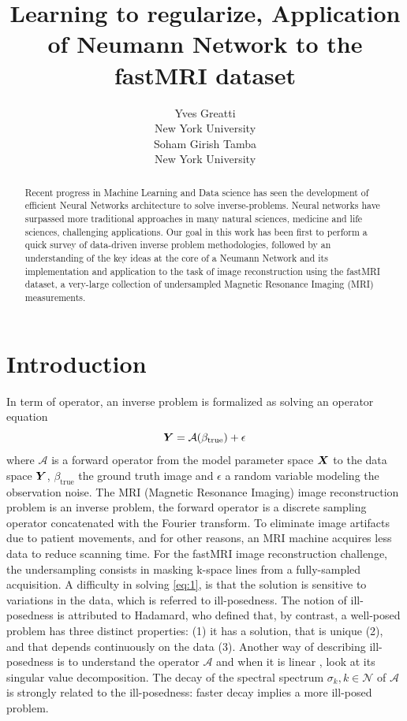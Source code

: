 \documentclass{article}
\title{Learning to regularize, Application of Neumann Network to the fastMRI dataset}
\author{%
  Yves Greatti \\
  New York University\\
   \And
    Soham Girish Tamba \\
    New York University\\
}
\begin{document}
\maketitle

\begin{abstract}
 Recent progress in Machine Learning and Data science has seen the development of efficient Neural Networks architecture to solve inverse-problems. Neural networks have surpassed more traditional approaches in 
  many natural sciences, medicine and life sciences, challenging applications.
 Our goal in this work has been first to perform a quick survey of data-driven inverse problem methodologies, followed by an understanding of the key ideas at the core of a Neumann Network and its implementation
 and application to the task of image reconstruction using the fastMRI dataset, a very-large collection of  undersampled Magnetic Resonance Imaging (MRI) measurements. 
  \end{abstract}
  
 \section{Introduction}
\label{Introduction}

In term of operator, an inverse problem is formalized as solving an operator equation
\begin{equation}
	\bm{Y} = \mathcal{A} (\beta_{\text{true}}) + \epsilon \label{eq:1}
\end{equation}
where $\mathcal{A}$ is a forward operator from the model parameter space $\bm{X}$ to the data space $\bm{Y}$,  $\beta_{\text{true}}$ the ground truth image and $\epsilon$ a random variable modeling the observation noise.
 The MRI (Magnetic Resonance Imaging) image reconstruction problem is an inverse problem, the forward operator is a discrete sampling operator concatenated with the Fourier transform.
 To eliminate image artifacts due to patient movements, and for other reasons, an MRI machine acquires less data to reduce scanning time.
For the fastMRI image reconstruction challenge, the undersampling consists  in masking k-space lines from a fully-sampled acquisition.
A difficulty in solving  \eqref{eq:1}, is that the solution is sensitive to variations in the data, which is referred to ill-posedness. The notion of  ill-posedness is attributed to Hadamard, who defined that, by contrast, a well-posed problem
has three distinct properties: (1) it has a solution, that is unique (2), and that depends continuously on the data (3). Another way of describing  ill-posedness is to understand the operator  $\mathcal{A}$ and when it is linear , look at its singular
value decomposition. The decay of the spectral spectrum $\sigma_k, k \in \mathcal{N}$ of  $\mathcal{A}$ is strongly related to the ill-posedness: faster decay implies a more ill-posed problem. 
 	
\end{document}
